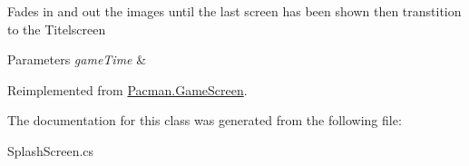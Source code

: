 Fades in and out the images until the last screen has been shown then transtition to the Titelscreen 


\begin{DoxyParams}{Parameters}
{\em game\-Time} & \\
\hline
\end{DoxyParams}


Reimplemented from \hyperlink{class_pacman_1_1_game_screen_a768b26cbc3ed823d0dcba5055ae9a8b4}{Pacman.\-Game\-Screen}.



The documentation for this class was generated from the following file\-:\begin{DoxyCompactItemize}
\item 
Splash\-Screen.\-cs\end{DoxyCompactItemize}
